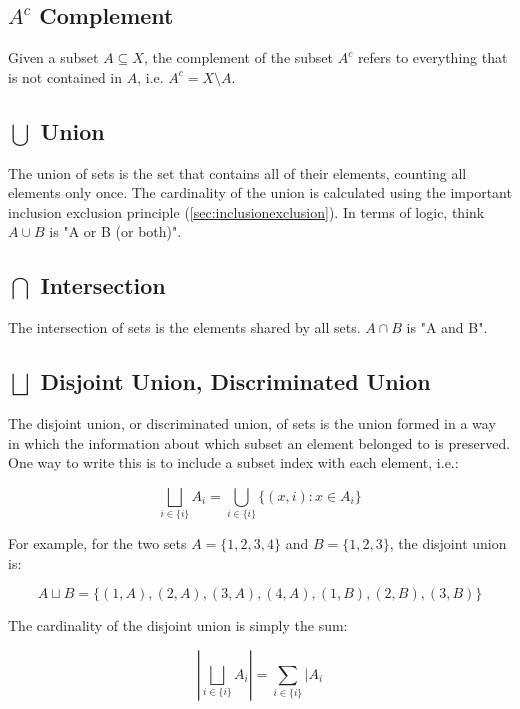 \subsection{$A^c$ Complement}
Given a subset $A \subseteq X$, the complement of the subset $A^c$ refers to everything that is not contained in $A$, i.e. $A^c = X\setminus A$. 


\subsection{$\bigcup$ Union}
The union of sets is the set that contains all of their elements, counting all elements only once. The cardinality of the union is calculated using the important inclusion exclusion principle (\ref{sec:inclusionexclusion}). In terms of logic, think $A\cup B$ is "A or B (or both)".

\subsection{$\bigcap$ Intersection}
The intersection of sets is the elements shared by all sets. $A\cap B$ is "A and B".

\subsection{$\bigsqcup$ Disjoint Union, Discriminated Union}
The disjoint union, or discriminated union, of sets is the union formed in a way in which the information about which subset an element belonged to is preserved. One way to write this is to include a subset index with each element, i.e.:

\begin{equation}
\bigsqcup_{i\in\{i\}}A_i = \bigcup_{i\in\{i\}} \{(x,i): x\in A_i\}
\end{equation}

For example, for the two sets $A=\{1,2,3,4\}$ and $B=\{1,2,3\}$, the disjoint union is:

\begin{equation}
A\sqcup B = \{(1,A),(2,A),(3,A),(4,A),(1,B),(2,B),(3,B)\}
\end{equation}

The cardinality of the disjoint union is simply the sum:

\begin{equation}
\left|\bigsqcup_{i\in\{i\}}A_i\right| = \sum_{i\in\{i\}}|A_i
\end{equation}

